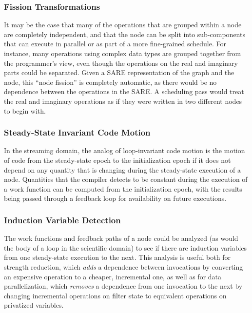 \subsubsection{Fission Transformations}

It may be the case that many of the operations that are grouped within
a node are completely independent, and that the node can be split into
sub-components that can execute in parallel or as part of a more
fine-grained schedule.  For instance, many operations using complex
data types are grouped together from the programmer's view, even
though the operations on the real and imaginary parts could be
separated.  Given a SARE representation of the graph and the node,
this ``node fission'' is completely automatic, as there would be no
dependence between the operations in the SARE.  A scheduling pass
would treat the real and imaginary operations as if they were written
in two different nodes to begin with.

\subsubsection{Steady-State Invariant Code Motion}

In the streaming domain, the analog of loop-invariant code motion is
the motion of code from the steady-state epoch to the initialization
epoch if it does not depend on any quantity that is changing during
the steady-state execution of a node.  Quantities that the compiler
detects to be constant during the execution of a work function can be
computed from the initialization epoch, with the results being passed
through a feedback loop for availability on future executions.

\subsubsection{Induction Variable Detection}

The work functions and feedback paths of a node could be analyzed (as
would the body of a loop in the scientific domain) to see if there are
induction variables from one steady-state execution to the next.  This
analysis is useful both for strength reduction, which {\it adds} a
dependence between invocations by converting an expensive operation to
a cheaper, incremental one, as well as for data parallelization, which
{\it removes} a dependence from one invocation to the next by changing
incremental operations on filter state to equivalent operations on
privatized variables.

